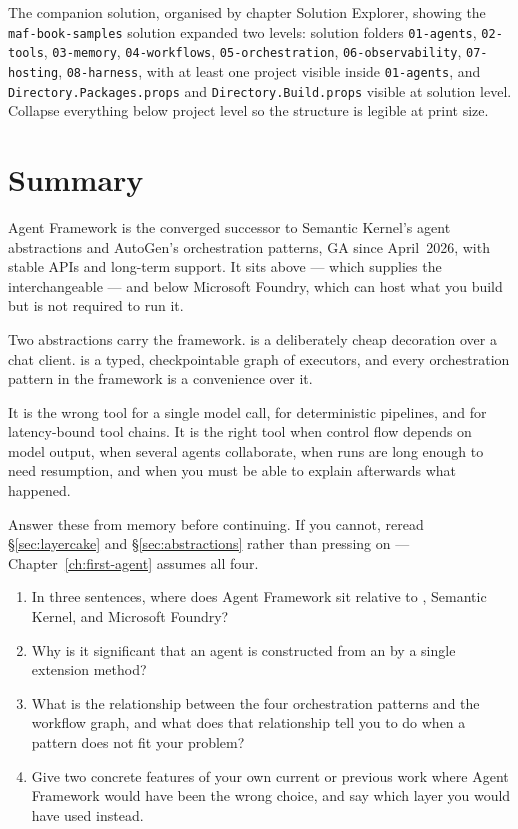 %
{The companion solution, organised by chapter}%
{\vsver{} Solution Explorer, showing the \texttt{maf-book-samples} solution
expanded two levels: solution folders \texttt{01-agents}, \texttt{02-tools},
\texttt{03-memory}, \texttt{04-workflows}, \texttt{05-orchestration},
\texttt{06-observability}, \texttt{07-hosting}, \texttt{08-harness}, with at
least one project visible inside \texttt{01-agents}, and
\texttt{Directory.Packages.props} and \texttt{Directory.Build.props} visible at
solution level. Collapse everything below project level so the structure is
legible at print size.}

\section{Summary}

Agent Framework is the converged successor to Semantic Kernel's agent
abstractions and AutoGen's orchestration patterns, GA since April~2026, with
stable APIs and long-term support. It sits above
 --- which supplies the interchangeable
 --- and below Microsoft Foundry, which can host what you build
but is not required to run it.

Two abstractions carry the framework.  is a deliberately cheap
decoration over a chat client.  is a typed, checkpointable graph of
executors, and every orchestration pattern in the framework is a convenience over
it.

It is the wrong tool for a single model call, for deterministic pipelines, and
for latency-bound tool chains. It is the right tool when control flow depends on
model output, when several agents collaborate, when runs are long enough to need
resumption, and when you must be able to explain afterwards what happened.

\begin{exercisebox}
Answer these from memory before continuing. If you cannot, reread
\S\ref{sec:layercake} and \S\ref{sec:abstractions} rather than pressing on ---
Chapter~\ref{ch:first-agent} assumes all four.

\begin{enumerate}[leftmargin=1.4em]
\item In three sentences, where does Agent Framework sit relative to
      , Semantic Kernel, and Microsoft Foundry?
\item Why is it significant that an agent is constructed from an
       by a single extension method?
\item What is the relationship between the four orchestration patterns and the
      workflow graph, and what does that relationship tell you to do when a
      pattern does not fit your problem?
\item Give two concrete features of your own current or previous work where
      Agent Framework would have been the wrong choice, and say which layer you
      would have used instead.
\end{enumerate}
\end{exercisebox}
